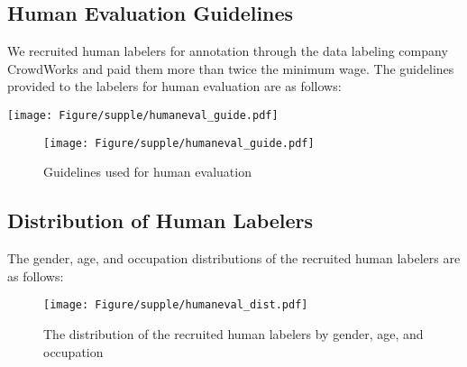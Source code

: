 \subsection{Human Evaluation Guidelines}
We recruited human labelers for annotation through the data labeling company CrowdWorks and paid them more than twice the minimum wage. The guidelines provided to the labelers for human evaluation are as follows:

\centering
\noindent{}
{\texttt{[image: Figure/supple/humaneval\_guide.pdf]}}

\begin{figure}[t!]
\noindent{}
{\texttt{[image: Figure/supple/humaneval\_guide.pdf]}}
\caption{Guidelines used for human evaluation}
\end{figure}

\subsection{Distribution of Human Labelers}
\noindent\raggedright  The gender, age, and occupation distributions of the recruited human labelers are as follows:

\begin{figure}[hb!]
\centering
\texttt{[image: Figure/supple/humaneval\_dist.pdf]}
\caption{The distribution of the recruited human labelers by gender, age, and occupation}
\end{figure}